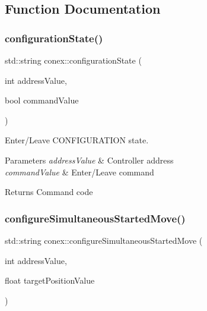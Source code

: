 \subsection{Function Documentation}
\mbox{\label{namespaceconex_aa9f0011a56576d7e9382d9d7d211e946}} 
\subsubsection{\texorpdfstring{configuration\+State()}{configurationState()}}
{\footnotesize\ttfamily std\+::string conex\+::configuration\+State (\begin{DoxyParamCaption}\item[{int}]{address\+Value,  }\item[{bool}]{command\+Value }\end{DoxyParamCaption})}



Enter/\+Leave C\+O\+N\+F\+I\+G\+U\+R\+A\+T\+I\+ON state. 


\begin{DoxyParams}{Parameters}
{\em address\+Value} & Controller address \\
\hline
{\em command\+Value} & Enter/\+Leave command \\
\hline
\end{DoxyParams}
\begin{DoxyReturn}{Returns}
Command code 
\end{DoxyReturn}
\mbox{\label{namespaceconex_a5fe4df9385c4ac7842eee6c04fa6bda6}} 
\subsubsection{\texorpdfstring{configure\+Simultaneous\+Started\+Move()}{configureSimultaneousStartedMove()}}
{\footnotesize\ttfamily std\+::string conex\+::configure\+Simultaneous\+Started\+Move (\begin{DoxyParamCaption}\item[{int}]{address\+Value,  }\item[{float}]{target\+Position\+Value }\end{DoxyParamCaption})}



